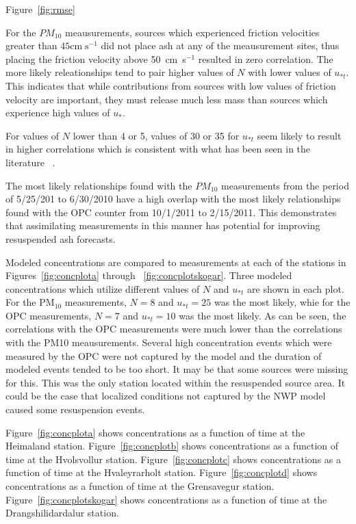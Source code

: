 Figure~\ref{fig:rmse}


For the $PM_{10}$ meausurements, sources which experienced friction velocities greater than $45 \mathrm{cm} \; \mathrm{s}^{-1}$
did not place ash at any of the meausurement sites, thus placing the friction velocity above 50~cm~s$^{-1}$ resulted in zero
correlation.  
The more likely releationships tend to  pair higher values of $N$ with lower values of $u_{*t}$. This indicates that while
contributions from sources with low values of friction velocity are important, they must release much less mass than sources
which experience high values of $u_{*}$.

For values of $N$ lower than 4 or 5, values of 30 or 35 for $u_{*t}$ seem likely to result in higher correlations 
 which is consistent with what
has been seen in the literature ~\citep{Leadbetter12, Folch14}.

The most likely relationships found with the $PM_{10}$ measurements from the period of 5/25/201 to 6/30/2010 have
a high overlap with the most likely relationships found with the OPC counter from 10/1/2011 to 2/15/2011.
This demonstrates that assimilating measurements in this manner has potential for improving resuspended ash forecasts.

Modeled concentrations are compared to measurements at each of the stations in Figures~\ref{fig:concplota} through ~\ref{fig:concplotskogar}.
Three modeled concentrations which utilize different values of $N$ and $u_{*t}$ are shown in each plot.
For the PM$_{10}$ measurements, $N=8$ and $u_{*t}=25$ was the most likely, whie for the OPC measurements, $N=7$ and $u_{*t}=10$
was the most likely.  As can be seen, the correlations with the OPC measurements were much lower than the correlations with the PM10 meausurements.
Several high concentration events which were measured by the OPC were not captured by the model and the duration of modeled events tended to be
too short. It may be that some sources were missing for this. This was the only station located within the resuspended source area. It could
be the case that localized conditions not captured by the NWP model caused some resuspension events.

Figure~\ref{fig:concplota} shows concentrations as a function of time at the Heimaland station.
Figure~\ref{fig:concplotb} shows concentrations as a function of time at the Hvolsvollur station.
Figure~\ref{fig:concplotc} shows concentrations as a function of time at the Hvaleyrarholt station.
Figure~\ref{fig:concplotd} shows concentrations as a function of time at the Grensavegur station.
Figure~\ref{fig:concplotskogar} shows concentrations as a function of time at the Drangshilidardalur station.


